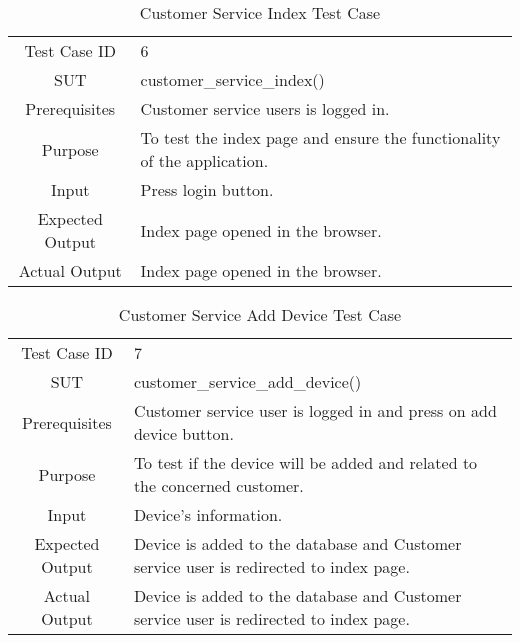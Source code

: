 	\begin{table}[H]
		\centering
		\renewcommand{\arraystretch}{1.5}
		\begin{tabular}[t]{ c  m{10cm} }
			Test Case ID & 6  \\
			SUT & customer\_service\_index() \\
			Prerequisites & Customer service users is logged in. \\
			Purpose & To test the index page and ensure the functionality of the application. \\
			Input & Press login button. \\
			Expected Output & Index page opened in the browser. \\
			Actual Output & Index page opened in the browser. \\
		\end{tabular}
		\caption{Customer Service Index Test Case}
		\renewcommand{\arraystretch}{1.0}
	\end{table}
	
	\begin{table}[H]
		\centering
		\renewcommand{\arraystretch}{1.5}
		\begin{tabular}[t]{ c  m{10cm} }
			Test Case ID & 7  \\
			SUT & customer\_service\_add\_device() \\
			Prerequisites & Customer service user is logged in and press on add device button. \\
			Purpose & To test if the device will be added and related to the concerned customer. \\
			Input & Device's information. \\
			Expected Output & Device is added to the database and Customer service user is redirected to index page. \\
			Actual Output & Device is added to the database and Customer service user is redirected to index page. \\
		\end{tabular}
		\caption{Customer Service Add Device Test Case}
		\renewcommand{\arraystretch}{1.0}
	\end{table}
	
